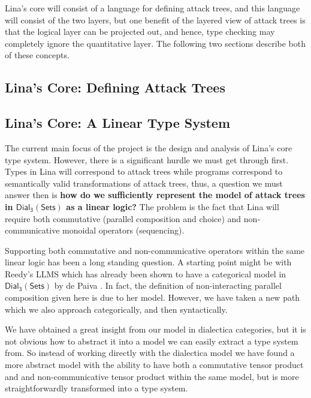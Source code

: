 \documentclass{sigplanconf}
\newcommand{\dial}[0]{\mathsf{Dial_3}(\mathsf{Sets})}
\begin{document}
Lina's core will consist of a language for defining attack trees, and
this language will consist of the two layers, but one benefit of the
layered view of attack trees is that the logical layer can be
projected out, and hence, type checking may completely ignore the
quantitative layer.  The following two sections describe both of these
concepts.

\subsection{Lina's Core: Defining Attack Trees}
\label{subsec:linas_core_defining_attack_trees}


\subsection{Lina's Core: A Linear Type System}
\label{subsec:linas_core_linear_type_system}

The current main focus of the project is the design and analysis of
Lina's core type system.  However, there is a significant hurdle we
must get through first.  Types in Lina will correspond to attack trees
while programs correspond to semantically valid transformations of
attack trees, thus, a question we must answer then is \textbf{how do
  we sufficiently represent the model of attack trees in $\dial$ as a
  linear logic?}  The problem is the fact that Lina will require both
commutative (parallel composition and choice) and non-communicative
monoidal operators (sequencing).

Supporting both commutative and non-communicative operators within the
same linear logic has been a long standing question.  A starting point
might be with Reedy's LLMS which has already been shown to have a
categorical model in $\dial$ by de Paiva \cite{dePaiva:2014a}.  In
fact, the definition of non-interacting parallel composition given
here is due to her model.  However, we have taken a new path which we
also approach categorically, and then syntactically.

We have obtained a great insight from our model in dialectica
categories, but it is not obvious how to abstract it into a model we
can easily extract a type system from.  So instead of working directly
with the dialectica model we have found a more abstract model with the
ability to have both a commutative tensor product and and
non-communicative tensor product within the same model, but is more
straightforwardly transformed into a type system.
\end{document}
